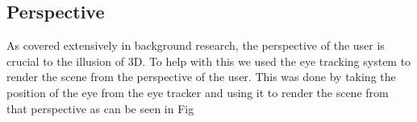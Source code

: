 
\subsection{Perspective}

As covered extensively in background research, the perspective of the user is crucial to the illusion of 3D. To help with this we used the eye tracking system to render the scene from the perspective of the user. This was done by taking the position of the eye from the eye tracker and using it to render the scene from that perspective as can be seen in Fig~\todo

